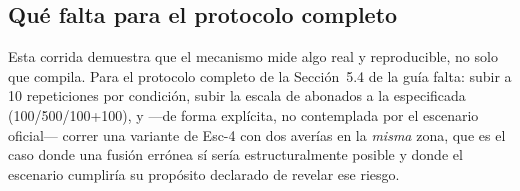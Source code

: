 \subsection{Qué falta para el protocolo completo}
\label{sec:que-falta-correl}

Esta corrida demuestra que el mecanismo mide algo real y reproducible, no solo que compila. Para
el protocolo completo de la Sección~5.4 de la guía falta: subir a 10 repeticiones por condición,
subir la escala de abonados a la especificada (100/500/100+100), y —de forma explícita, no
contemplada por el escenario oficial— correr una variante de Esc-4 con dos averías en la
\emph{misma} zona, que es el caso donde una fusión errónea sí sería estructuralmente posible y
donde el escenario cumpliría su propósito declarado de revelar ese riesgo.
